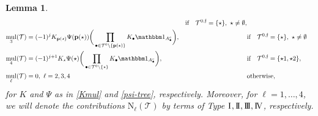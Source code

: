 \documentclass[%
11pt,  reqno]{amsart}
\makeatletter
\newcommand{\I}{\hspace{0.2mm}\textup{I}\hspace{0.2mm}}
\newcommand{\II}{\textup{I \hspace{-2.9mm} I} }
\newcommand{\III}{\textup{I \hspace{-2.9mm} I \hspace{-2.9mm} I}}
\newcommand{\IV}{\textup{I \hspace{-2.9mm} V}}
\newcommand{\5}{\textup{V}}
\newcommand{\ind}{\mathbbm 1}
\newtheorem{lemma}[theorem]{Lemma}
\theoremstyle{remark}
\newcommand{\bul}{\bullet}
\newcommand{\TT}{\mathcal{T}}
\newcommand{\bfrak}{\mathfrak{b}}
\newcommand{\gfrak}{\mathfrak{g}}
\newcommand{\pb}{\mathbf{p}}
\renewcommand{\l}{\ell}
\newcommand{\ff}{\mathfrak{f}}
\DeclareMathOperator{\mul}{mul}
\def\<#1>{\csname MH@symb@#1\endcsname}
\numberwithin{equation}{section}
\numberwithin{theorem}{section}
\newcommand{\NN}{\mathrm{N}}
\makeatother
\begin{document}
\begin{lemma}
\begin{align}
    && \text{if} \quad  \TT^{0,\ff} = \{\star\}, \ \star\neq \emptyset, 
    \\
    \mul_3(\TT)&=(-1)^{j}  K_{\pb(\star)}\Psi(\pb(\star)) \bigg( \prod_{\bul \in \TT^0 \setminus\{\pb(\star)\}}  K_\bul  \ind_{A_\bul^c} \bigg),
    &&
    \text{if} \quad  \TT^{0,\ff} = \{\star\},  \ \star\neq \emptyset
    \label{wint0c}
    \\
     \mul_4(\TT)&=(-1)^{j+1}  K_\star\Psi(\star) \bigg( \prod_{\bul \in \TT^0 \setminus\{\star\}}  K_\bul  \ind_{A_\bul^c} \bigg), 
    && \text{if} \quad  \TT^{0,\ff} = \{\star1, \star2\}, 
    \\
    \mul_{\l}(\TT) & = 0, \ \l=2,3,4 && \text{otherwise}, 
\end{align}
for $K$ and $\Psi$ as in \eqref{Kmul} and \eqref{psi-tree}, respectively.
Moreover, for $\l=1,\ldots, 4$, we will denote the contributions $\NN_\l(\TT) $ by terms of Type $\I,\II,\III,\IV$, respectively. 


 


\end{lemma}
\end{document}
